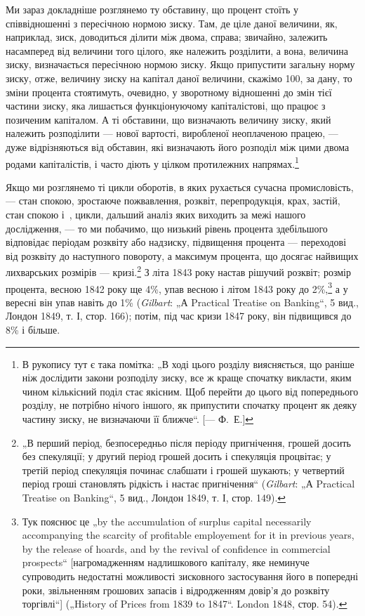 
Ми зараз докладніше розглянемо ту обставину, що процент
стоїть у співвідношенні з пересічною нормою зиску. Там, де
ціле даної величини, як, наприклад, зиск, доводиться ділити між
двома, справа; звичайно, залежить насамперед від величини того
цілого, яке належить розділити, а вона, величина зиску, визначається
пересічною нормою зиску. Якщо припустити загальну
норму зиску, отже, величину зиску на капітал даної величини,
скажімо \deq{} 100, за дану, то зміни процента стоятимуть, очевидно,
у зворотному відношенні до змін тієї частини зиску, яка лишається
функціонуючому капіталістові, що працює з позиченим
капіталом. А ті обставини, що визначають величину зиску, який
належить розподілити — нової вартості, виробленої неоплаченою
працею, — дуже відрізняються від обставин, які визначають його
розподіл між цими двома родами капіталістів, і часто діють у цілком
протилежних напрямах.\footnote{
В рукопису тут є така помітка: „В ході цього розділу виясняється, що
раніше ніж дослідити закони розподілу зиску, все ж краще спочатку викласти,
яким чином кількісний поділ стає якісним. Щоб перейти до цього від попереднього
розділу, не потрібно нічого іншого, як припустити спочатку процент як
деяку частину зиску, не визначаючи її ближче“. [— Ф.~Е.]
}

Якщо ми розглянемо ті цикли оборотів, в яких рухається сучасна
промисловість, — стан спокою, зростаюче пожвавлення, розквіт,
перепродукція, крах, застій, стан спокою і~, цикли,
дальший аналіз яких виходить за межі нашого дослідження, —
то ми побачимо, що низький рівень процента здебільшого відповідає
періодам розквіту або надзиску, підвищення процента —
переходові від розквіту до наступного повороту, а максимум
процента, що досягає найвищих лихварських розмірів — кризі.\footnote{
„В перший період, безпосередньо після періоду пригнічення, грошей
досить без спекуляції; у другий період грошей досить і спекуляція процвітає;
у третій період спекуляція починає слабшати і грошей шукають; у четвертий
період гроші становлять рідкість і настає пригнічення“ (\emph{Gilbart}: „А Practical
Treatise on Banking“, 5 вид., Лондон 1849, т. І, стор. 149).
}
З літа 1843 року настав рішучий розквіт; розмір процента, весною
1842 року ще 4\%, упав весною і літом 1843 року до 2\%,\footnote{
Тук пояснює це „by the accumulation of surplus capital necessarily accompanying
the scarcity of profitable employement for it in previous years, by the release
of hoards, and by the revival of confidence in commercial prospects“ [нагромадженням
надлишкового капіталу, яке неминуче супроводить недостатні
можливості зисковного застосування його в попередні роки, звільненням грошових
запасів і відродженням довір’я до розквіту торгівлі“] („History of
Prices from 1839 to 1847“. London 1848, стор. 54).
}
а у вересні він упав навіть до 1\% (\emph{Gilbart}: „А Practical Treatise
on Banking“, 5 вид., Лондон 1849, т. І, стор. 166); потім, під час
кризи 1847 року, він підвищився до 8\% і більше.

